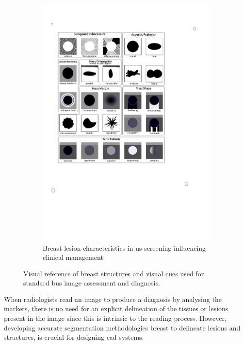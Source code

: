 \begin{figure}
\begin{subfigure}[b]{0.4\textwidth}
        \includegraphics[trim = 65 345 200 124, clip,width=\textwidth]{birads}
        \caption[]%
        {Breast lesion characteristics in \ac{us} screening influencing clinical management~\cite{raza2010us}}    
        \label{fig:lesions:lesions}
    \end{subfigure}
    \caption {{\small Visual reference of breast structures and visual cues used for standard \ac{bus} image assessment and diagnosis.}} 
    \label{fig:lesions}
\end{figure}

When radiologists read an image to produce a diagnosis by analysing the markers, there is no need for an explicit delineation of the tissues or lesions present in the image since this is intrinsic to the reading process.
However, developing accurate segmentation methodologies breast to delineate lesions and structures, is crucial for designing \ac{cad} systems.

